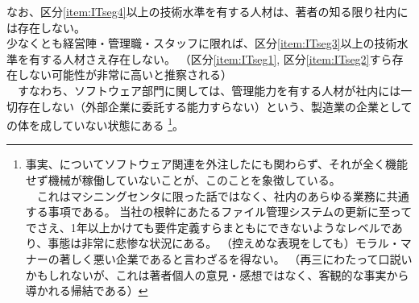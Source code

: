 \begin{hosoku}
なお、区分\ref{item:ITseg4}\hx 以上の技術水準を有する人材は、著者の知る限り社内には存在しない。\\
少なくとも経営陣・管理職・スタッフに限れば、区分\ref{item:ITseg3}\hx 以上の技術水準を有する人材さえ存在しない。
（区分\ref{item:ITseg1}, 区分\ref{item:ITseg2}\hx すら存在しない可能性が非常に高いと推察される）\\
　すなわち、ソフトウェア部門に関しては、管理能力を有する人材が社内には一切存在しない（外部企業に委託する能力すらない）という、製造業の企業としての体を成していない状態にある
\footnote{事実、\DMC についてソフトウェア関連を外注したにも関わらず、それが全く機能せず機械が稼働していないことが、このことを象徴している。\\
　これはマシニングセンタに限った話ではなく、社内のあらゆる業務に共通する事項である。
当社の根幹にあたるファイル管理システムの更新に至ってでさえ、1年以上かけても要件定義すらまともにできないようなレベルであり、事態は非常に悲惨な状況にある。
（控えめな表現をしても）モラル・マナーの著しく悪い企業であると言わざるを得ない。
（再三にわたって口説いかもしれないが、これは著者個人の意見・感想ではなく、客観的な事実から導かれる帰結である）}。

\end{hosoku}
